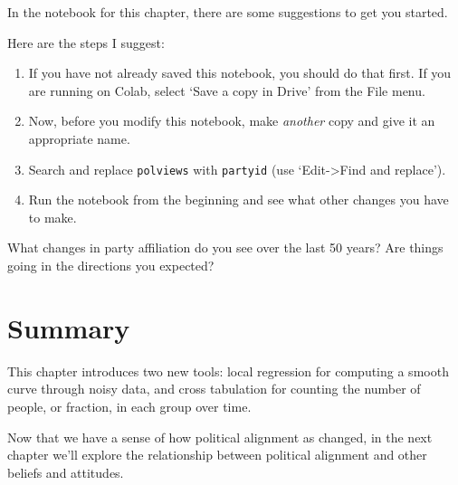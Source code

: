 In the notebook for this chapter, there are some suggestions to get you
started.

Here are the steps I suggest:

\begin{enumerate}
\def\labelenumi{\arabic{enumi})}
\item
  If you have not already saved this notebook, you should do that first.
  If you are running on Colab, select `Save a copy in Drive' from the
  File menu.
\item
  Now, before you modify this notebook, make \emph{another} copy and
  give it an appropriate name.
\item
  Search and replace \passthrough{\lstinline!polviews!} with
  \passthrough{\lstinline!partyid!} (use `Edit-\textgreater Find and
  replace').
\item
  Run the notebook from the beginning and see what other changes you
  have to make.
\end{enumerate}

What changes in party affiliation do you see over the last 50 years? Are
things going in the directions you expected?

\section{Summary}\label{summary}

This chapter introduces two new tools: local regression for computing a
smooth curve through noisy data, and cross tabulation for counting the
number of people, or fraction, in each group over time.

Now that we have a sense of how political alignment as changed, in the
next chapter we'll explore the relationship between political alignment
and other beliefs and attitudes.

